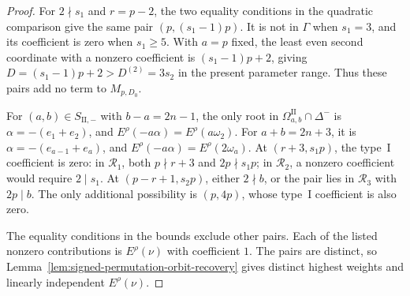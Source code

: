 \documentclass[11pt,a4paper]{amsart}
\theoremstyle{plain}
\numberwithin{equation}{section}
\newenvironment{pf}{\begin{proof}}{\end{proof}}
\begin{document}
\begin{pf}
	For \(2\nmid s_1\) and \(r=p-2\), the two equality conditions
	in the quadratic comparison give the same pair
	\((p,(s_1-1)p)\). It is not in \(\Gamma\) when \(s_1=3\), and
	its coefficient is zero when \(s_1\ge5\).
	With \(a=p\) fixed, the least even second coordinate with a nonzero
	coefficient is \((s_1-1)p+2\), giving
	\(D=(s_1-1)p+2>D^{(2)}=3s_2\) in the present parameter range.
	Thus these pairs add no term to \(M_{p,D_0}\).
	
	For \((a,b)\in S_{\mathrm{II},-}\) with \(b-a=2n-1\), the only
	root in \(\Omega_{a,b}^{\mathrm{II}}\cap\Delta^-\) is
	\(\alpha=-(e_1+e_2)\), and \(E^\rho(-a\alpha)=E^\rho(a\omega_2)\).
	For \(a+b=2n+3\), it is \(\alpha=-(e_{a-1}+e_a)\), and
	\(E^\rho(-a\alpha)=E^\rho(2\omega_a)\).
	At \((r+3,s_1p)\), the type~\(\mathrm I\) coefficient is zero:
	in \(\mathcal R_1\), both \(p\nmid r+3\) and \(2p\nmid s_1p\);
	in \(\mathcal R_2\), a nonzero coefficient would require \(2\mid s_1\).
	At \((p-r+1,s_2p)\), either \(2\nmid b\), or the pair lies in
	\(\mathcal R_3\) with \(2p\mid b\). The only additional possibility
	is \((p,4p)\), whose type~\(\mathrm I\) coefficient is also zero.
	
	The equality conditions in the bounds exclude other pairs.
	Each of the listed nonzero contributions is \(E^\rho(\nu)\) with
	coefficient \(1\). The pairs are distinct, so
	Lemma~\ref{lem:signed-permutation-orbit-recovery} gives distinct
	highest weights and linearly independent \(E^\rho(\nu)\).
	
	\smallskip
	

\end{pf}
\end{document}
